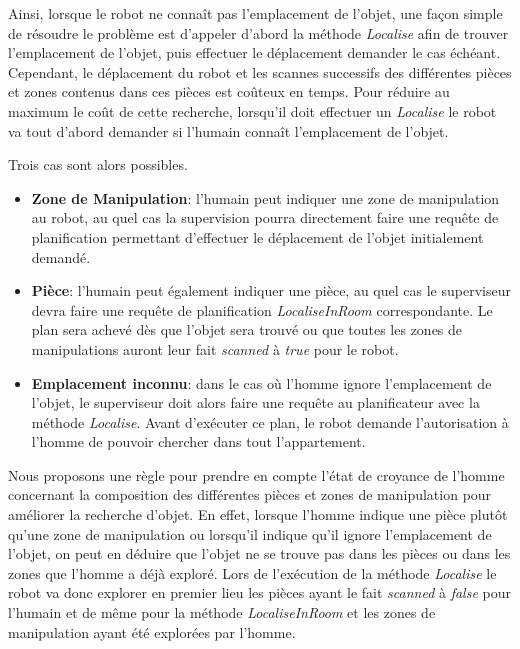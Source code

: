 \documentclass[a4paper,11pt,twoside]{StyleThese}
\begin{document}
Ainsi, lorsque le robot ne connaît pas l'emplacement de l'objet, une façon simple de résoudre le problème est d'appeler d'abord la méthode \textit{Localise} afin de trouver l'emplacement de l'objet, puis effectuer le déplacement demander le cas échéant. Cependant, le déplacement du robot et les scannes successifs des différentes pièces et zones contenus dans ces pièces est coûteux en temps.
Pour réduire au maximum le coût de cette recherche, lorsqu'il doit effectuer un \textit{Localise} le robot va tout d'abord demander si l'humain connaît l'emplacement de l'objet.

Trois cas sont alors possibles.
\begin{itemize}
\item \textbf{Zone de Manipulation}: l'humain peut indiquer une zone de manipulation au robot, au quel cas la supervision pourra directement faire une requête de planification permettant d'effectuer le déplacement de l'objet initialement demandé.

\item \textbf{Pièce}: l'humain peut également indiquer une pièce, au quel cas le superviseur devra faire une requête de planification \textit{LocaliseInRoom} correspondante. Le plan sera achevé dès que l'objet sera trouvé ou que toutes les zones de manipulations auront leur fait \textit{scanned} à \textit{true} pour le robot.

\item \textbf{Emplacement inconnu}: dans le cas où l'homme ignore l'emplacement de l'objet, le superviseur doit alors faire une requête au planificateur avec la méthode \textit{Localise}. Avant d'exécuter ce plan, le robot demande l'autorisation à l'homme de pouvoir chercher dans tout l'appartement.
\end{itemize}  


Nous proposons une règle pour prendre en compte l'état de croyance de l'homme concernant la composition des différentes pièces et zones de manipulation pour améliorer la recherche d'objet.
En effet, lorsque l'homme indique une pièce plutôt qu'une zone de manipulation ou lorsqu'il indique qu'il ignore l'emplacement de l'objet, on peut en déduire que l'objet ne se trouve pas dans les pièces ou dans les zones que l'homme a déjà exploré. Lors de l'exécution de la méthode \textit{Localise} le robot va donc explorer en premier lieu les pièces ayant le fait \textit{scanned} à \textit{false} pour l'humain et de même pour la méthode \textit{LocaliseInRoom} et les zones de manipulation ayant été explorées par l'homme.
\end{document}
